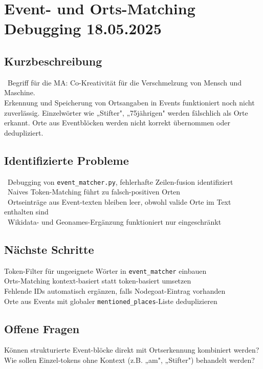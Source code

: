 \documentclass{article}
\begin{document}
\section{Event- und Orts-Matching Debugging \small 18.05.2025}

\subsection*{Kurzbeschreibung}

\faExclamationTriangle\ Begriff für die MA: Co-Kreativität für die Verschmelzung von Mensch und Maschine.\\
Erkennung und Speicherung von Ortsangaben in Events funktioniert noch nicht zuverlässig. Einzelwörter wie „Stifter", „75jährigen" werden fälschlich als Orte erkannt. Orte aus Eventblöcken werden nicht korrekt übernommen oder dedupliziert.

\subsection*{Identifizierte Probleme}
\faExclamationTriangle\ Debugging von \texttt{event\_matcher.py}, fehlerhafte Zeilen-fusion identifiziert\\
\faExclamationTriangle\ Naives Token-Matching führt zu falsch-positiven Orten\\
\faExclamationTriangle\ Ortseinträge aus Event-texten bleiben leer, obwohl valide Orte im Text enthalten sind\\
\faExclamationTriangle\ Wikidata- und Geonames-Ergänzung funktioniert nur eingeschränkt

\subsection*{Nächste Schritte}
 Token-Filter für ungeeignete Wörter in \texttt{event\_matcher} einbauen\\
 Orts-Matching kontext-basiert statt token-basiert umsetzen\\
 Fehlende IDs automatisch ergänzen, falls Nodegoat-Eintrag vorhanden\\
 Orte aus Events mit globaler \texttt{mentioned\_places}-Liste deduplizieren

\subsection*{Offene Fragen}
 Können strukturierte Event-blöcke direkt mit Ortserkennung kombiniert werden?\\
 Wie sollen Einzel-tokens ohne Kontext (z.B. „am", „Stifter") behandelt werden?\\
\end{document}
